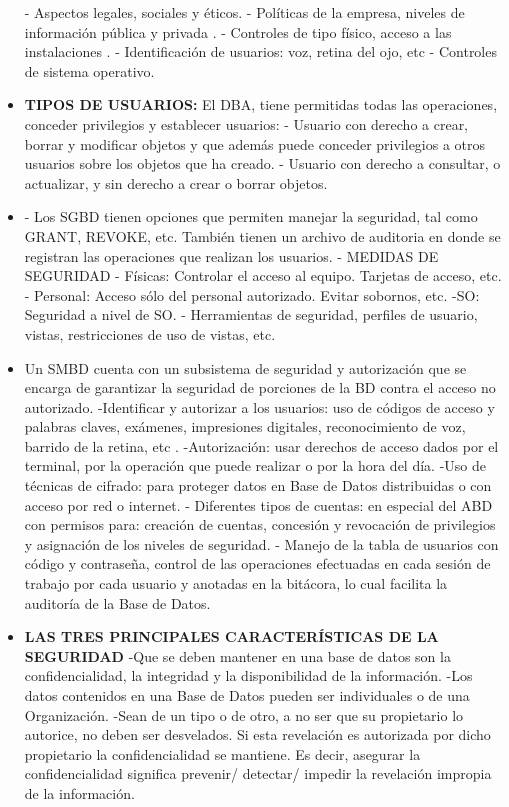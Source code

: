 \documentclass[%
 reprint,
 amsmath,amssymb,
 aps,
]{revtex4-1}
\begin{document}
\begin{itemize}
	\subitem - Aspectos legales, sociales y éticos.
	\subitem - Políticas de la empresa, niveles de información pública y privada .
	\subitem - Controles de tipo físico, acceso a las instalaciones .
	\subitem - Identificación de usuarios: voz, retina del ojo, etc
	\subitem - Controles de sistema operativo.
	\item \textbf{TIPOS DE USUARIOS: } El DBA, tiene permitidas todas las operaciones, conceder privilegios y establecer usuarios:
	\subitem - Usuario con derecho a crear, borrar y modificar objetos y que además puede conceder privilegios a otros usuarios sobre los objetos que ha creado.
	\subitem - Usuario con derecho a consultar, o actualizar, y sin derecho a crear o borrar objetos.
	\item - Los SGBD tienen opciones que permiten manejar la seguridad, tal como GRANT, REVOKE, etc. También tienen un archivo de auditoria en donde se registran las operaciones que realizan los usuarios.
	\subitem - MEDIDAS DE SEGURIDAD
	\subitem - Físicas: Controlar el acceso al equipo. Tarjetas de acceso, etc.
	\subitem - Personal: Acceso sólo del personal autorizado. Evitar sobornos, etc.
	\subitem -SO: Seguridad a nivel de SO.
	\subitem - Herramientas de seguridad, perfiles de usuario, vistas, restricciones de uso de vistas, etc. \cite{web2}
	\item Un SMBD cuenta con un subsistema de seguridad y autorización que se encarga de garantizar la seguridad de porciones de la BD contra el acceso no autorizado.
	\subitem -Identificar y autorizar a los usuarios: uso de códigos de acceso y palabras claves, exámenes, impresiones digitales, reconocimiento de voz, barrido de la retina, etc  .
	\subitem -Autorización: usar derechos de acceso dados por el terminal, por la operación que puede realizar o por la hora del día.
	\subitem -Uso de técnicas de cifrado: para proteger datos en Base de Datos distribuidas o con acceso por red o internet. 
	\subitem - Diferentes tipos de cuentas: en especial del ABD con permisos para: creación de cuentas, concesión y revocación de privilegios y asignación de los niveles de seguridad.
	\subitem - Manejo de la tabla de usuarios con código y contraseña, control de las operaciones efectuadas en cada sesión de trabajo por cada usuario y anotadas en la bitácora, lo cual facilita la auditoría de la Base de Datos.
	\item \textbf{LAS TRES PRINCIPALES CARACTERÍSTICAS DE LA SEGURIDAD}  		\subitem -Que se deben mantener en una base de datos son la confidencialidad, la integridad y la disponibilidad de la información. 
	\subitem  -Los datos contenidos en una Base de Datos pueden ser individuales o de una Organización. \subitem -Sean de un tipo o de otro, a no ser que su propietario lo autorice, no deben ser desvelados. Si esta revelación es autorizada por dicho propietario la confidencialidad se mantiene. Es decir, asegurar la confidencialidad significa prevenir/ detectar/ impedir la revelación impropia de la información.
	
	
	
\end{itemize}
\end{document}
